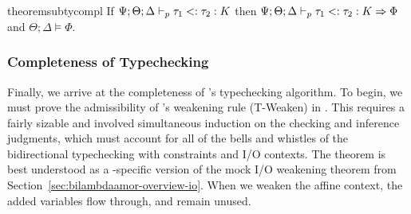 \begin{restatable}{theorem}{subtycompl}
If $\Psi ; \Theta ; \Delta \vdash_p \tau_1 <: \tau_2 : K$ then  $\Psi ; \Theta ; \Delta \vdash_p \tau_1 <: \tau_2 : K \Rightarrow \Phi$ and $\Theta ; \Delta \vDash \Phi$.
\label{thm:subty-compl}
\end{restatable}

\subsubsection{Completeness of Typechecking}

Finally, we arrive at the completeness of \bilambdaamor's typechecking algorithm. To begin, we must prove the admissibility of \dlambdaamor's weakening rule (T-Weaken) in \bilambdaamor. This requires a fairly sizable and involved simultaneous induction on the checking and inference judgments, which must account for all of the bells and whistles of the bidirectional typechecking with constraints and I/O contexts. The theorem is best understood as a \bilambdaamor -specific version of the mock I/O weakening theorem from Section~\ref{sec:bilambdaamor-overview-io}. When we weaken the affine context, the added variables flow through, and remain unused.


